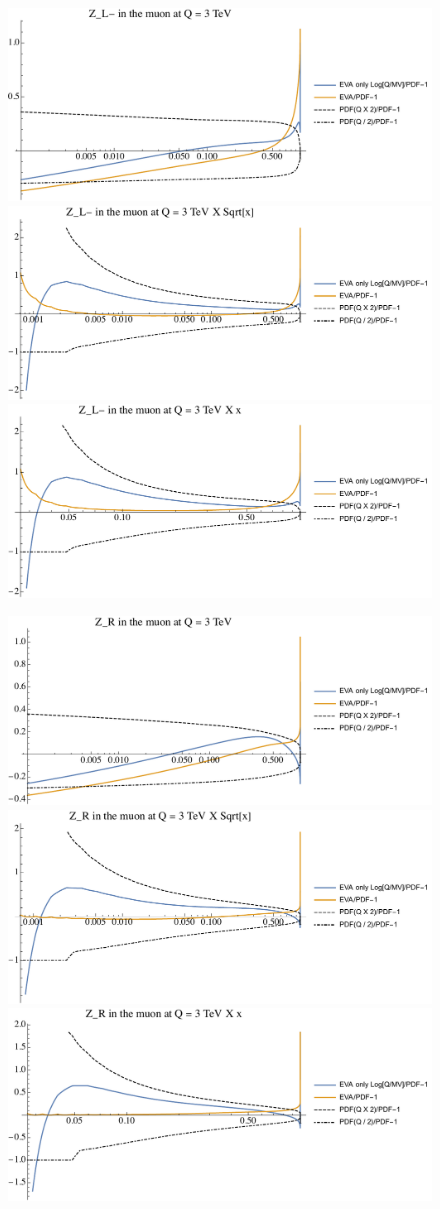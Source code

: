 \documentclass[a4paper,11pt]{article}
\begin{document}
\begin{figure}[ht]
\includegraphics[width=0.4\linewidth]{PlotPDFs/ratios/3TeV/Z_L-_Q.pdf}
\includegraphics[width=0.4\linewidth]{PlotPDFs/ratios/3TeV/Z_L-_Qsqrtx.pdf}
\includegraphics[width=0.4\linewidth]{PlotPDFs/ratios/3TeV/Z_L-_Qx.pdf}
\end{figure}

\begin{figure}[ht]
\includegraphics[width=0.4\linewidth]{PlotPDFs/ratios/3TeV/Z_R_Q.pdf}
\includegraphics[width=0.4\linewidth]{PlotPDFs/ratios/3TeV/Z_R_Qsqrtx.pdf}
\includegraphics[width=0.4\linewidth]{PlotPDFs/ratios/3TeV/Z_R_Qx.pdf}
\end{figure}
\end{document}
